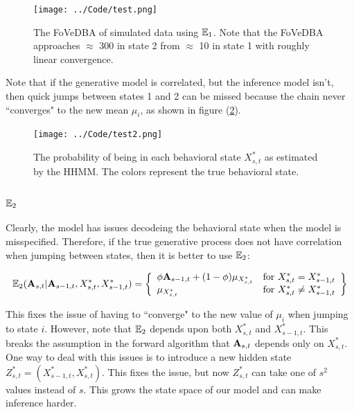  \begin{figure}[h!]
 	\centering
 	\texttt{[image: ../Code/test.png]}
 	\caption{The FoVeDBA of simulated data using $\mathbb{E}_1$. Note that the FoVeDBA approaches $\approx$ 300 in state 2 from $\approx$ 10 in state 1 with roughly linear convergence.}
 	\label{fig:FOVEDBA}
 \end{figure}
 
 Note that if the generative model is correlated, but the inference model isn't, then quick jumps between states 1 and 2 can be missed because the chain never ``converges" to the new mean $\mu_i$, as shown in figure (\ref{fig:STATE}).
 
\begin{figure}[h!]
	\centering
	\texttt{[image: ../Code/test2.png]}
	\caption{The probability of being in each behavioral state $X^*_{s,t}$ as estimated by the HHMM. The colors represent the true behavioral state.}
	\label{fig:STATE}
\end{figure}
 
 \subsubsection{$\mathbb{E}_2$}
 
Clearly, the model has issues decodeing the behavioral state when the model is misspecified. Therefore, if the true generative process does not have correlation when jumping between states, then it is better to use $\mathbb{E}_2$:

$$\mathbb{E}_2(\mathbf{A}_{s,t} | \mathbf{A}_{s-1,t}, X^*_{s,t}, X^*_{s-1,t}) = \left\{\begin{array}{lr}
\phi \mathbf{A}_{s-1,t} + (1-\phi) \mu_{X^*_{s,t}} & \text{for } X^*_{s,t} = X^*_{s-1,t}\\
\mu_{X^*_{s,t}} & \text{for } X^*_{s,t} \neq X^*_{s-1,t}
\end{array}\right\}$$

This fixes the issue of having to ``converge" to the new value of $\mu_i$ when jumping to state $i$. However, note that $\mathbb{E}_2$ depends upon both $X^*_{s,t}$ and $X^*_{s-1,t}$. This breaks the assumption in the forward algorithm that $\mathbf{A}_{s,t}$ depends only on $X^*_{s,t}$. One way to deal with this issues is to introduce a new hidden state $Z^*_{s,t} = (X^*_{s-1,t},X^*_{s,t})$. This fixes the issue, but now $Z^*_{s,t}$ can take one of $s^2$ values instead of $s$. This grows the state space of our model and can make inference harder.
 
 \fi
 
